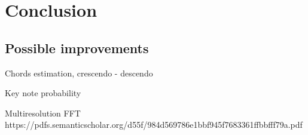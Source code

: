 \chapter{Conclusion}\label{ch:conclusion}


\section{Possible improvements}

Chords estimation, crescendo - descendo

Key note probability

Multiresolution FFT
https://pdfs.semanticscholar.org/d55f/984d569786e1bbf945f7683361ffbbfff79a.pdf